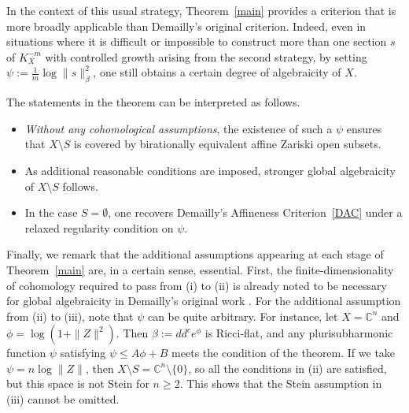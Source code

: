 \documentclass[a4paper, 12pt]{article}
\begin{document}

In the context of this usual strategy, Theorem~\ref{main} provides a criterion that is more broadly applicable than Demailly's original criterion. Indeed, even in situations where it is difficult or impossible to construct more than one section $s$ of $K_X^{-m}$ with controlled growth arising from the second strategy, by setting $\psi := \frac{1}{m}\log \|s\|_\beta^2$, one still obtains a certain degree of algebraicity of $X$.

The statements in the theorem can be interpreted as follows.
\begin{itemize}
\item[(i)] \emph{Without any cohomological assumptions}, the existence of such a $\psi$ ensures that $X\setminus S$ is covered by birationally equivalent affine Zariski open subsets.
\item[(ii), (iii)] As additional reasonable conditions are imposed, stronger global algebraicity of $X \setminus S$ follows.
\item[(iv)] In the case $S = \emptyset$, one recovers Demailly's Affineness Criterion~\ref{DAC} under a relaxed regularity condition on $\psi$.
\end{itemize}

Finally, we remark that the additional assumptions appearing at each stage of Theorem~\ref{main} are, in a certain sense, essential. First, the finite-dimensionality of cohomology required to pass from (i) to (ii) is already noted to be necessary for global algebraicity in Demailly's original work \cite[Chapter~13]{D85}. For the additional assumption from (ii) to (iii), note that $\psi$ can be quite arbitrary. For instance, let $X = \mathbb{C}^n$ and $\phi = \log(1+\|Z\|^2)$. Then $\beta := dd^c e^\phi$ is Ricci-flat, and any plurisubharmonic function $\psi$ satisfying $\psi \le A\phi + B$ meets the condition of the theorem. If we take $\psi = n \log \|Z\|$, then $X \setminus S = \mathbb{C}^n \setminus \{0\}$, so all the conditions in (ii) are satisfied, but this space is not Stein for $n\ge 2$. This shows that the Stein assumption in (iii) cannot be omitted.
\end{document}
